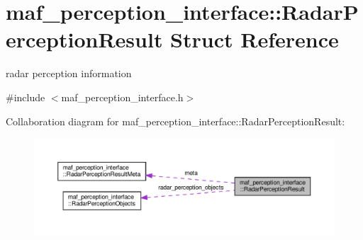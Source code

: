 \hypertarget{structmaf__perception__interface_1_1RadarPerceptionResult}{}\section{maf\+\_\+perception\+\_\+interface\+:\+:Radar\+Perception\+Result Struct Reference}
\label{structmaf__perception__interface_1_1RadarPerceptionResult}


radar perception information  




{\ttfamily \#include $<$maf\+\_\+perception\+\_\+interface.\+h$>$}



Collaboration diagram for maf\+\_\+perception\+\_\+interface\+:\+:Radar\+Perception\+Result\+:\nopagebreak
\begin{figure}[H]
\begin{center}
\leavevmode
\includegraphics[width=350pt]{structmaf__perception__interface_1_1RadarPerceptionResult__coll__graph}
\end{center}
\end{figure}
